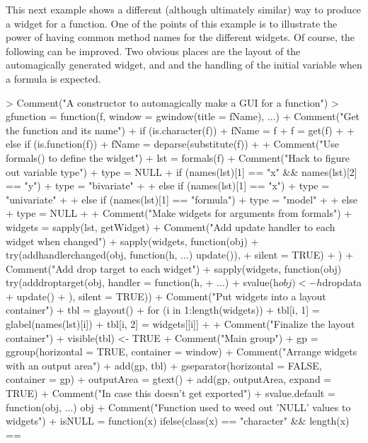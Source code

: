 \documentclass[12pt]{article}
\begin{document}
This next example shows a different (although ultimately similar) way
to produce a widget for a function. One of the points of this example
is to illustrate the power of having common method names for the
different widgets. Of course, the following can be improved. Two obvious
places are the layout of the automagically generated widget, and and
the handling of the initial variable when a formula is expected.

\begin{Schunk}
\begin{Sinput}
> Comment("A constructor to automagically make a GUI for a function")
> gfunction = function(f, window = gwindow(title = fName), ...) {
+     Comment("Get the function and its name")
+     if (is.character(f)) {
+         fName = f
+         f = get(f)
+     }
+     else if (is.function(f)) {
+         fName = deparse(substitute(f))
+     }
+     Comment("Use formals() to define the widget")
+     lst = formals(f)
+     Comment("Hack to figure out variable type")
+     type = NULL
+     if (names(lst)[1] == "x" && names(lst)[2] == "y") {
+         type = "bivariate"
+     }
+     else if (names(lst)[1] == "x") {
+         type = "univariate"
+     }
+     else if (names(lst)[1] == "formula") {
+         type = "model"
+     }
+     else {
+         type = NULL
+     }
+     Comment("Make widgets for arguments from formals")
+     widgets = sapply(lst, getWidget)
+     Comment("Add update handler to each widget when changed")
+     sapply(widgets, function(obj) {
+         try(addhandlerchanged(obj, function(h, ...) update()), 
+             silent = TRUE)
+     })
+     Comment("Add drop target to each widget")
+     sapply(widgets, function(obj) try(adddroptarget(obj, handler = function(h, 
+         ...) {
+         svalue(h$obj) <- h$dropdata
+         update()
+     }), silent = TRUE))
+     Comment("Put widgets into a layout container")
+     tbl = glayout()
+     for (i in 1:length(widgets)) {
+         tbl[i, 1] = glabel(names(lst)[i])
+         tbl[i, 2] = widgets[[i]]
+     }
+     Comment("Finalize the layout container")
+     visible(tbl) <- TRUE
+     Comment("Main group")
+     gp = ggroup(horizontal = TRUE, container = window)
+     Comment("Arrange widgets with an output area")
+     add(gp, tbl)
+     gseparator(horizontal = FALSE, container = gp)
+     outputArea = gtext()
+     add(gp, outputArea, expand = TRUE)
+     Comment("In case this doesn't get exported")
+     svalue.default = function(obj, ...) obj
+     Comment("Function used to weed out 'NULL' values to widgets")
+     isNULL = function(x) ifelse(class(x) == "character" && length(x) == 
}
\end{Sinput}
\end{Schunk}
\end{document}
